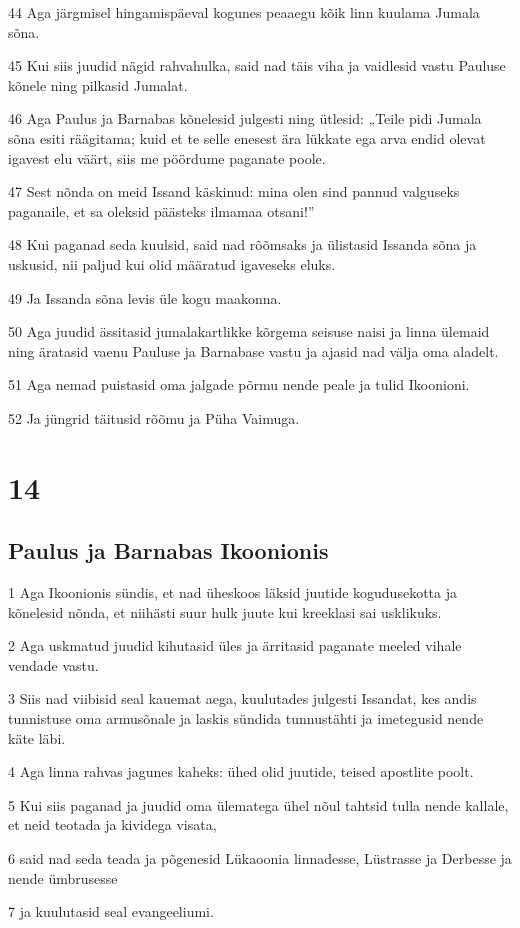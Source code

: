 \par 44 Aga järgmisel hingamispäeval kogunes peaaegu kõik linn kuulama Jumala sõna.
\par 45 Kui siis juudid nägid rahvahulka, said nad täis viha ja vaidlesid vastu Pauluse kõnele ning pilkasid Jumalat.
\par 46 Aga Paulus ja Barnabas kõnelesid julgesti ning ütlesid: „Teile pidi Jumala sõna esiti räägitama; kuid et te selle enesest ära lükkate ega arva endid olevat igavest elu väärt, siis me pöördume paganate poole.
\par 47 Sest nõnda on meid Issand käskinud: mina olen sind pannud valguseks paganaile, et sa oleksid päästeks ilmamaa otsani!”
\par 48 Kui paganad seda kuulsid, said nad rõõmsaks ja ülistasid Issanda sõna ja uskusid, nii paljud kui olid määratud igaveseks eluks.
\par 49 Ja Issanda sõna levis üle kogu maakonna.
\par 50 Aga juudid ässitasid jumalakartlikke kõrgema seisuse naisi ja linna ülemaid ning äratasid vaenu Pauluse ja Barnabase vastu ja ajasid nad välja oma aladelt.
\par 51 Aga nemad puistasid oma jalgade põrmu nende peale ja tulid Ikoonioni.
\par 52 Ja jüngrid täitusid rõõmu ja Püha Vaimuga.


\chapter{14}

\section*{Paulus ja Barnabas Ikoonionis}

\par 1 Aga Ikoonionis sündis, et nad üheskoos läksid juutide kogudusekotta ja kõnelesid nõnda, et niihästi suur hulk juute kui kreeklasi sai usklikuks.
\par 2 Aga uskmatud juudid kihutasid üles ja ärritasid paganate meeled vihale vendade vastu.
\par 3 Siis nad viibisid seal kauemat aega, kuulutades julgesti Issandat, kes andis tunnistuse oma armusõnale ja laskis sündida tunnustähti ja imetegusid nende käte läbi.
\par 4 Aga linna rahvas jagunes kaheks: ühed olid juutide, teised apostlite poolt.
\par 5 Kui siis paganad ja juudid oma ülematega ühel nõul tahtsid tulla nende kallale, et neid teotada ja kividega visata,
\par 6 said nad seda teada ja põgenesid Lükaoonia linnadesse, Lüstrasse ja Derbesse ja nende ümbrusesse
\par 7 ja kuulutasid seal evangeeliumi.


